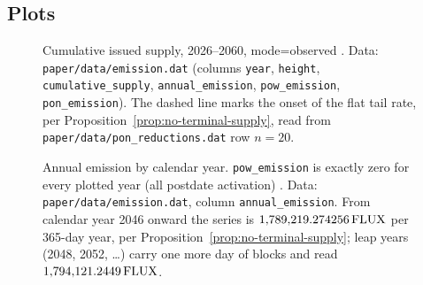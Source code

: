 \subsection{Plots}
\label{sec:mp-plots}

\begin{figure}[H]
\centering
{}
\caption{Cumulative issued \Flux supply, 2026--2060, mode=observed
\shipped {}. Data: \texttt{paper/\allowbreak{}data/\allowbreak{}emission.\allowbreak{}dat}
(columns \texttt{year}, \texttt{height}, \texttt{cumulative\_supply}, \texttt{annual\_emission},
\texttt{pow\_emission}, \texttt{pon\_emission}). The dashed line marks the onset of the flat
tail rate, per Proposition~\ref{prop:no-terminal-supply}, read from
\texttt{paper/\allowbreak{}data/\allowbreak{}pon\_reductions.\allowbreak{}dat} row $n=20$.}
\label{fig:cumulative-supply}
\end{figure}

\begin{figure}[H]
\centering
{}
\caption{Annual \Flux emission by calendar year. \texttt{pow\_emission} is exactly zero for every
plotted year (all postdate \PoN activation) \shipped {}.
Data: \texttt{paper/\allowbreak{}data/\allowbreak{}emission.\allowbreak{}dat}, column \texttt{annual\_emission}. From calendar year 2046
onward the series is $1{,}789{,}219.274256\,\mathrm{FLUX}$ per 365-day year, per
Proposition~\ref{prop:no-terminal-supply}; leap years (2048, 2052, \ldots) carry one more day of
blocks and read $1{,}794{,}121.2449\,\mathrm{FLUX}$.}
\label{fig:annual-emission}
\end{figure}

